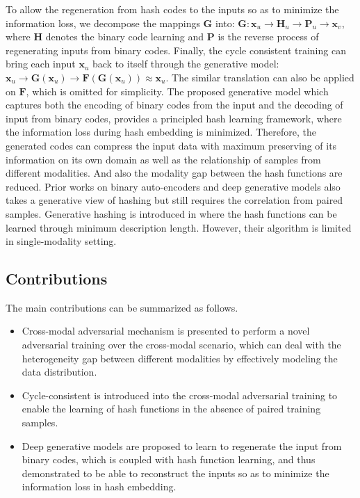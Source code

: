 \documentclass[10pt,journal,twocolumn]{IEEEtran}
\begin{document}
To allow the regeneration from hash codes to the inputs so as to minimize the information loss, we decompose the mappings $\boldsymbol G$ into: $\boldsymbol G: \boldsymbol x_u \rightarrow \boldsymbol H_u \rightarrow \boldsymbol P_u \rightarrow \boldsymbol x_v$, where $\boldsymbol H$ denotes the binary code learning and $\boldsymbol P$ is the reverse process of regenerating inputs from binary codes. Finally, the cycle consistent training can bring each input $\boldsymbol x_u$ back to itself through the generative model: $\boldsymbol x_u \rightarrow \boldsymbol G(\boldsymbol x_u) \rightarrow \boldsymbol F( \boldsymbol G(\boldsymbol x_u)) \approx \boldsymbol x_u$. The similar translation can also be applied on $\boldsymbol F$, which is omitted for simplicity. The proposed generative model which captures both the encoding of binary codes from the input and the decoding of input from binary codes, provides a principled hash learning framework, where the information loss during hash embedding is minimized. Therefore, the generated codes can compress the input data with maximum preserving of its information on its own domain as well as the relationship of samples from different modalities. And also the modality gap between the hash functions are reduced. Prior works on binary auto-encoders \cite{Corr-AE} and deep generative models \cite{TUCH,CMDVH} also takes a generative view of hashing but still requires the correlation from paired samples. Generative hashing is introduced in \cite{SGH} where the hash functions can be learned through minimum description length. However, their algorithm is limited in single-modality setting.


\subsection{Contributions}
The main contributions can be summarized as follows.
\begin{itemize}
  \item Cross-modal adversarial mechanism is presented to perform a novel adversarial training over the cross-modal scenario, which can deal with the heterogeneity gap between different modalities by effectively modeling the data distribution.
  \item Cycle-consistent is introduced into the cross-modal adversarial training to enable the learning of hash functions in the absence of paired training samples.
  \item Deep generative models are proposed to learn to regenerate the input from binary codes, which is coupled with hash function learning, and thus demonstrated to be able to reconstruct the inputs so as to minimize the information loss in hash embedding.
\end{itemize}
\end{document}
